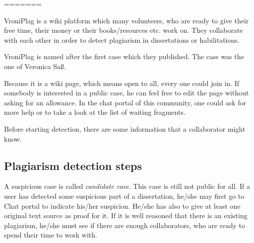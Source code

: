 %
%
%
%
%
%
%
%
%
%
%
%
%
%
=======

VroniPlag is a wiki platform which many volunteers, who are ready to give their free time, their money or 
their books/resources etc. work on. They collaborate with each other in order to detect plagiarism in dissertations or
habilitations.

VroniPlag is named after the first case which they published. The case was the one of Veronica Saß.

Because it is a wiki page, which means open to all, every one could join in. If somebody is interested in a public 
case, he can feel free to edit the page without asking for an allowance. In the chat portal of this community, one could 
ask for more help or to take a look at the list of waiting fragments.

Before starting detection, there are some information that a collaborator might know.

\subsection{Plagiarism detection steps}
A suspicious case is called \textit{candidate case}. This case is still not public for all. If a user has detected some 
suspicious part of a dissertation, he/she may first go to Chat portal to indicate his/her suspicion. He/she has 
also to give at least one original text source as proof for it. If it is well reasoned that there is an existing 
plagiarism, he/she must see if there are enough collaborators, who are ready to spend their time to work with.

